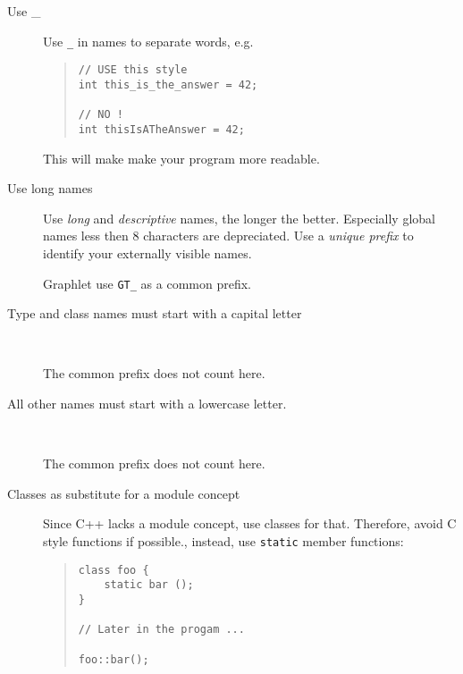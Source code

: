 \begin{description}

  \item[Use \_] Use \texttt{\_} in names to separate
  words, e.g.
  
  \begin{quote}
\begin{verbatim}
// USE this style
int this_is_the_answer = 42;

// NO !
int thisIsATheAnswer = 42;
\end{verbatim}
  \end{quote}

  This will make make your program more readable.
  
  \item[Use long names] Use \emph{long} and
  \emph{descriptive} names, the longer the better. Especially
  global names less then 8 characters are depreciated.  Use a
  \emph{unique prefix} to identify your externally visible names.

  \begin{note}       
    Graphlet use \texttt{GT\_} as a common prefix.
  \end{note}
  
  \item[Type and class names must start with a capital letter] \strut\\  
  \begin{note}       
    The common prefix does not count here.
  \end{note}
  
  \item[All other names must start with a lowercase letter.] \strut\\
  \begin{note}       
    The common prefix does not count here.
  \end{note}
  
  \item[Classes as substitute for a module concept]  
  Since C++ lacks a module concept, use classes for that.
  Therefore, avoid C style functions if possible., instead, use
  \texttt{static} member functions:

  \begin{quote}
\begin{verbatim}
class foo {
    static bar ();
}

// Later in the progam ...

foo::bar();
\end{verbatim}
  \end{quote}

   
\end{description}



